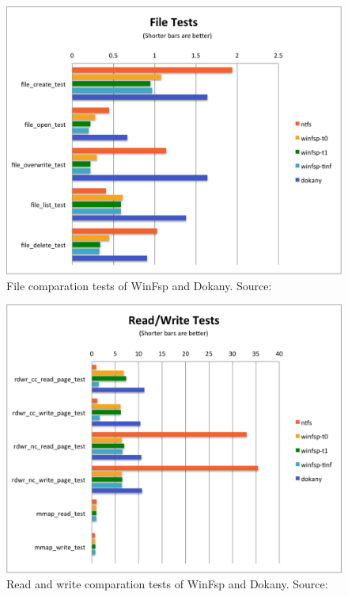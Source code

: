 \begin{figure}[htb]
	\centering
	\includegraphics[width=\columnwidth]{obrazky-figures/file_tests.pdf}
	\caption{File comparation tests of WinFsp and Dokany. Source:\cite{GitWinFsp}}
	\label{winfsp_file_tests}
\end{figure}

\begin{figure}[htb]
	\centering
	\includegraphics[width=\columnwidth]{obrazky-figures/rdwr_tests.pdf}
	\caption{Read and write comparation tests of WinFsp and Dokany. Source:\cite{GitWinFsp}}
	\label{winfsp_rdwr_tests}
\end{figure}

